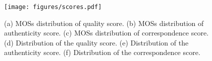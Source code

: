 
\begin{figure}[t]
  \centering
  \texttt{[image: figures/scores.pdf]}
  \caption{ (a) MOSs distribution of quality score.
  (b) MOSs distribution of authenticity score.
  (c) MOSs distribution of correspondence score.
  (d) Distribution of the quality score.
  (e) Distribution of the authenticity score.
  (f) Distribution of the correspondence score.}
\end{figure}